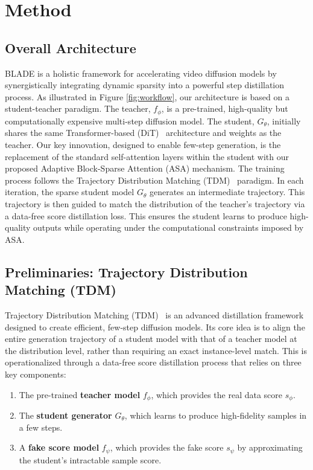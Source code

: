 \documentclass[letterpaper]{article} %
\begin{document}
\section{Method}

\subsection{Overall Architecture}
BLADE is a holistic framework for accelerating video diffusion models by synergistically integrating dynamic sparsity into a powerful step distillation process. As illustrated in Figure \ref{fig:workflow}, our architecture is based on a student-teacher paradigm. The teacher, $f_{\phi}$, is a pre-trained, high-quality but computationally expensive multi-step diffusion model. The student, $G_{\theta}$, initially shares the same Transformer-based (DiT)~\cite{peebles2023scalablediffusionmodelstransformers} architecture and weights as the teacher. Our key innovation, designed to enable few-step generation, is the replacement of the standard self-attention layers within the student with our proposed Adaptive Block-Sparse Attention (ASA) mechanism.
The training process follows the Trajectory Distribution Matching (TDM)~\cite{luo2025tdm} paradigm. In each iteration, the sparse student model $G_{\theta}$ generates an intermediate trajectory. This trajectory is then guided to match the distribution of the teacher's trajectory via a data-free score distillation loss. This ensures the student learns to produce high-quality outputs while operating under the computational constraints imposed by ASA.

\subsection{Preliminaries: Trajectory Distribution Matching (TDM)}
Trajectory Distribution Matching (TDM)~\cite{luo2025tdm} is an advanced distillation framework designed to create efficient, few-step diffusion models. Its core idea is to align the entire generation trajectory of a student model with that of a teacher model at the distribution level, rather than requiring an exact instance-level match. This is operationalized through a data-free score distillation process that relies on three key components:
\begin{enumerate}
\item The pre-trained \textbf{teacher model} $f_{\phi}$, which provides the real data score $s_{\phi}$.
\item The \textbf{student generator} $G_{\theta}$, which learns to produce high-fidelity samples in a few steps.
\item A \textbf{fake score model} $f_{\psi}$, which provides the fake score $s_{\psi}$ by approximating the student's intractable sample score.
\end{enumerate}
\end{document}
